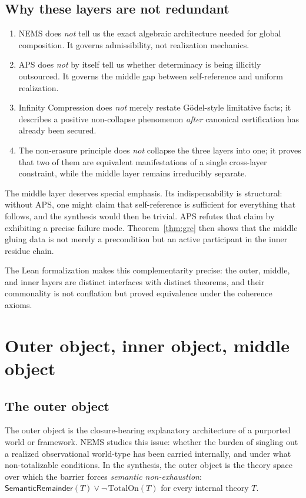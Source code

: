 \documentclass[11pt]{article}
\newcommand{\SemRem}{\ensuremath{\mathsf{SemanticRemainder}}}
\begin{document}
\subsection{Why these layers are not redundant}

\begin{enumerate}[leftmargin=2em]
\item NEMS does \emph{not} tell us the exact algebraic architecture needed for global
composition.  It governs admissibility, not realization mechanics.
\item APS does \emph{not} by itself tell us whether determinacy is being illicitly
outsourced.  It governs the middle gap between self-reference and uniform realization.
\item Infinity Compression does \emph{not} merely restate Gödel-style limitative facts;
it describes a positive non-collapse phenomenon \emph{after} canonical certification has
already been secured.
\item The non-erasure principle does \emph{not} collapse the three layers into one; it
proves that two of them are equivalent manifestations of a single cross-layer constraint,
while the middle layer remains irreducibly separate.
\end{enumerate}

The middle layer deserves special emphasis.  Its indispensability is structural: without
APS, one might claim that self-reference is sufficient for everything that follows, and
the synthesis would then be trivial.  APS refutes that claim by exhibiting a precise
failure mode.  Theorem~\ref{thm:grc} then shows that the middle gluing data is not
merely a precondition but an active participant in the inner residue chain.

The Lean formalization makes this complementarity precise: the outer, middle, and inner
layers are distinct interfaces with distinct theorems, and their commonality is not
conflation but proved equivalence under the coherence axioms.

\section{Outer object, inner object, middle object}
\label{sec:objects}

\subsection{The outer object}

The outer object is the closure-bearing explanatory architecture of a purported world
or framework.  NEMS studies this issue: whether the burden of singling out a realized
observational world-type has been carried internally, and under what non-totalizable
conditions.  In the synthesis, the outer object is the theory space over which the
barrier forces \emph{semantic non-exhaustion}: $\SemRem(T) \lor \neg\,\mathrm{TotalOn}(T)$
for every internal theory $T$.
\end{document}
